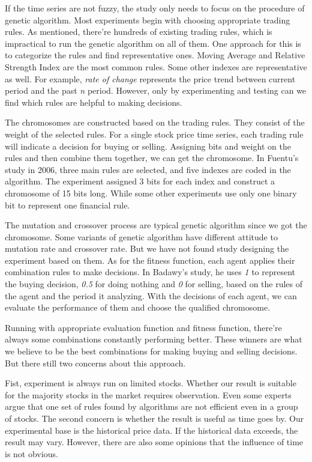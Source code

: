 \documentclass{article}
\begin{document}
If the time series are not fuzzy, the study only needs to focus on the procedure of genetic algorithm.
Most experiments begin with choosing appropriate trading rules.
As mentioned, there're hundreds of existing trading rules, which is impractical to run the genetic algorithm on all of them.
One approach for this is to categorize the rules and find representative ones.
Moving Average and Relative Strength Index are the most common rules.
Some other indexes are representative as well.
For example, \emph{rate of change} represents the price trend between current period and the past \emph{n} period.
However, only by experimenting and testing can we find which rules are helpful to making decisions.

The chromosomes are constructed based on the trading rules.
They consist of the weight of the selected rules.
For a single stock price time series, each trading rule will indicate a decision for buying or selling.
Assigning bits and weight on the rules and then combine them together, we can get the chromosome.
In Fuentu's study in 2006, three main rules are selected, and five indexes are coded in the algorithm. \cite{de2006genetic}
The experiment assigned 3 bits for each index and construct a chromosome of 15 bits long.
While some other experiments use only one binary bit to represent one financial rule. \cite{korczak2002stock}

The mutation and crossover process are typical genetic algorithm since we got the chromosome.
Some variants of genetic algorithm have different attitude to mutation rate and crossover rate.
But we have not found study designing the experiment based on them.
As for the fitness function, each agent applies their combination rules to make decisions.
In Badawy's study, he uses \emph{1} to represent the buying decision, \emph{0.5} for doing nothing and \emph{0} for selling,
based on the rules of the agent and the period it analyzing. \cite{1609619}
With the decisions of each agent, we can evaluate the performance of them and choose the qualified chromosome.

Running with appropriate evaluation function and fitness function, there're always some combinations constantly performing better.
These winners are what we believe to be the best combinations for making buying and selling decisions.
But there still two concerns about this approach.

Fist, experiment is always run on limited stocks.
Whether our result is suitable for the majority stocks in the market requires observation.
Even some experts argue that one set of rules found by algorithms are not efficient even in a group of stocks. \cite{korczak2002stock}
The second concern is whether the result is useful as time goes by.
Our experimental base is the historical price data.
If the historical data exceeds, the result may vary.
However, there are also some opinions that the influence of time is not obvious. \cite{korczak2002stock}
\end{document}
